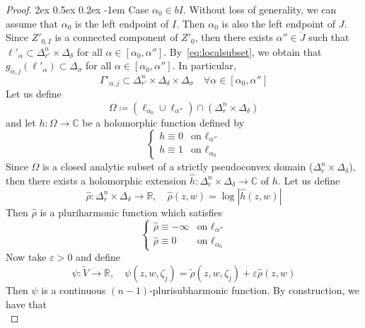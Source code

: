 \documentclass[reqno,oneside]{amsart}
\makeatletter
\newcommand{\numberset}{\mathbb}
\newcommand{\R}{\numberset{R}}
\newcommand{\C}{\numberset{C}}
\renewcommand{\epsilon}{\varepsilon}
\theoremstyle{definition}
\theoremstyle{plain}
\theoremstyle{remark}
\renewcommand{\paragraph}{
		\@startsection{paragraph}{4}
		{\z@}
		{2ex \@plus 0.5ex \@minus 0.2ex}
		{-1em}
		{\normalfont\bfseries}
	}
\makeatother
\begin{document}
\begin{proof}
	\paragraph{Case {\boldmath $\alpha_0\in bI$}.} Without loss of generality, we can assume that $\alpha_0$ is the left endpoint of $I$. Then $\alpha_0$ is also the left endpoint of $J$. Since $Z'_{0,I}$ is a connected component of $Z'_0$, then there exists $\alpha''\in\mathring{J}$ such that $\ell'_\alpha\subset\Delta_{r'}^n\times\Delta_\delta$ for all $\alpha\in[\alpha_0,\alpha'']$. By~\eqref{eq:localsubset}, we obtain that $g_{\alpha,j}(\ell'_\alpha)\subset\Delta_\sigma$ for all $\alpha\in[\alpha_0,\alpha'']$. In particular,
    \begin{equation}
    \label{eq:localinclusion2}
        \Gamma'_{\alpha,j}\subset\Delta_{r'}^n\times\Delta_\delta\times\Delta_\sigma \quad \forall\alpha\in[\alpha_0,\alpha'']
    \end{equation}    
    Let us define
    \[
        \Omega\coloneqq(\ell_{\alpha_0}\cup\ell_{\alpha''})\cap(\Delta_r^n\times\Delta_\delta)
    \]
    and let $h:\Omega\to\C$ be a holomorphic function defined by
    \[
        \begin{cases}
            h\equiv0 & \text{on $\ell_{\alpha''}$} \\
            h\equiv1 & \text{on $\ell_{\alpha_0}$}
        \end{cases}
    \]
    Since $\Omega$ is a closed analytic subset of a strictly pseudoconvex domain ($\Delta_r^n\times\Delta_\delta$), then there exists a holomorphic extension $\hat{h}:\Delta_r^n\times\Delta_\delta\to\C$ of $h$. Let us define
    \[
        \hat\rho:\Delta_r^n\times\Delta_\delta\to\R, \quad \hat\rho(z,w)=\log|\hat{h}(z,w)|
    \]
    Then $\hat\rho$ is a pluriharmonic function which satisfies
    \begin{equation}
    \label{eq:cases2}
        \begin{cases}
            \hat\rho\equiv-\infty & \text{on $\ell_{\alpha''}$} \\
            \hat\rho\equiv0 & \text{on $\ell_{\alpha_0}$}
        \end{cases}
    \end{equation}
    Now take $\epsilon>0$ and define
    \[
        \psi:\tilde{V}\to\R, \quad \psi(z,w,\zeta_j)=\tilde\rho(z,w,\zeta_j)+\epsilon\hat\rho(z,w)
    \]
    Then $\psi$ is a continuous $(n-1)$-plurisubharmonic function. By construction, we have that
    \begin{equation}
    \label{eq:max_point2}

\end{equation}
\end{proof}
\end{document}
